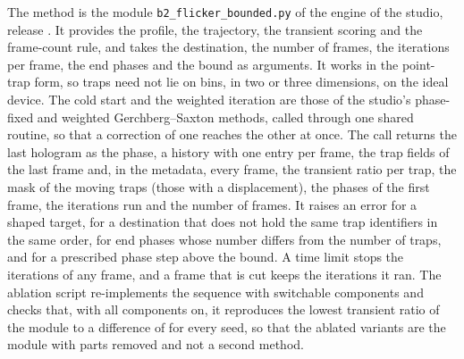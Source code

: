 The method is the module \texttt{b2\_flicker\_bounded.py} of the engine of the studio, release \engineRelease{}. It provides the profile, the trajectory, the transient scoring and the frame-count rule, and takes the destination, the number of frames, the iterations per frame, the end phases and the bound as arguments. It works in the point-trap form, so traps need not lie on bins, in two or three dimensions, on the ideal device. The cold start and the weighted iteration are those of the studio's phase-fixed and weighted Gerchberg--Saxton methods, called through one shared routine, so that a correction of one reaches the other at once. The call returns the last hologram as the phase, a history with one entry per frame, the trap fields of the last frame and, in the metadata, every frame, the transient ratio per trap, the mask of the moving traps (those with a displacement), the phases of the first frame, the iterations run and the number of frames. It raises an error for a shaped target, for a destination that does not hold the same trap identifiers in the same order, for end phases whose number differs from the number of traps, and for a prescribed phase step above the bound. A time limit stops the iterations of any frame, and a frame that is cut keeps the iterations it ran. The ablation script re-implements the sequence with switchable components and checks that, with all components on, it reproduces the lowest transient ratio of the module to a difference of \ablTCheck{} for every seed, so that the ablated variants are the module with parts removed and not a second method.
